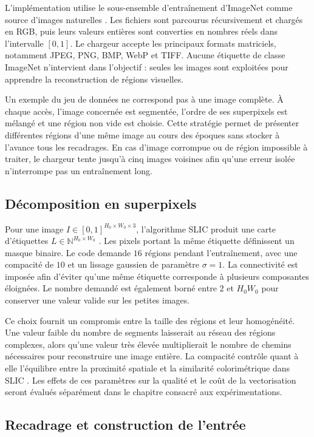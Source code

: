 \documentclass[12pt, a4paper, oneside]{report}
\begin{document}
L'implémentation utilise le sous-ensemble d'entraînement d'ImageNet comme source d'images naturelles \cite{deng2009imagenet}. Les fichiers sont parcourus récursivement et chargés en RGB, puis leurs valeurs entières sont converties en nombres réels dans l'intervalle $[0,1]$. Le chargeur accepte les principaux formats matriciels, notamment JPEG, PNG, BMP, WebP et TIFF. Aucune étiquette de classe ImageNet n'intervient dans l'objectif : seules les images sont exploitées pour apprendre la reconstruction de régions visuelles.

Un exemple du jeu de données ne correspond pas à une image complète. À chaque accès, l'image concernée est segmentée, l'ordre de ses superpixels est mélangé et une région non vide est choisie. Cette stratégie permet de présenter différentes régions d'une même image au cours des époques sans stocker à l'avance tous les recadrages. En cas d'image corrompue ou de région impossible à traiter, le chargeur tente jusqu'à cinq images voisines afin qu'une erreur isolée n'interrompe pas un entraînement long.

\subsection{Décomposition en superpixels}

Pour une image $I \in [0,1]^{H_0 \times W_0 \times 3}$, l'algorithme SLIC produit une carte d'étiquettes $L \in \mathbb{N}^{H_0 \times W_0}$ \cite{achanta2012slic}. Les pixels portant la même étiquette définissent un masque binaire. Le code demande $16$ régions pendant l'entraînement, avec une compacité de $10$ et un lissage gaussien de paramètre $\sigma=1$. La connectivité est imposée afin d'éviter qu'une même étiquette corresponde à plusieurs composantes éloignées. Le nombre demandé est également borné entre $2$ et $H_0W_0$ pour conserver une valeur valide sur les petites images.

Ce choix fournit un compromis entre la taille des régions et leur homogénéité. Une valeur faible du nombre de segments laisserait au réseau des régions complexes, alors qu'une valeur très élevée multiplierait le nombre de chemins nécessaires pour reconstruire une image entière. La compacité contrôle quant à elle l'équilibre entre la proximité spatiale et la similarité colorimétrique dans SLIC \cite{achanta2012slic}. Les effets de ces paramètres sur la qualité et le coût de la vectorisation seront évalués séparément dans le chapitre consacré aux expérimentations.

\subsection{Recadrage et construction de l'entrée}
\end{document}
